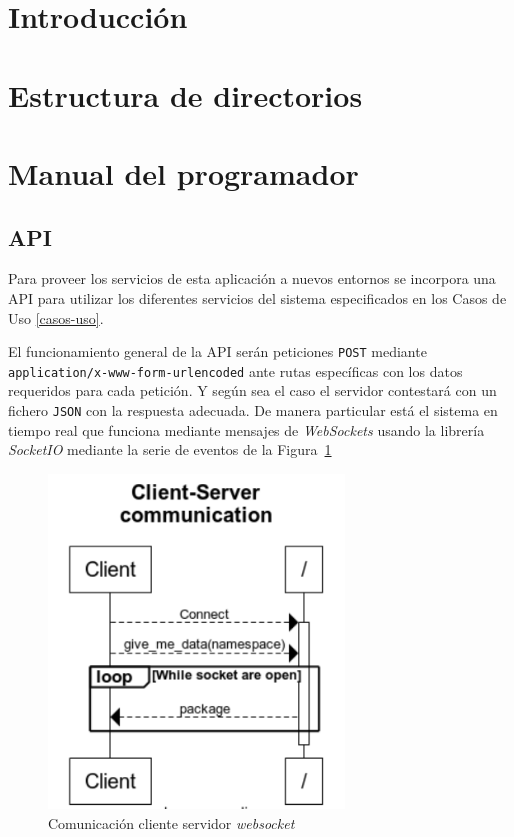 
\section{Introducción}

\section{Estructura de directorios}

\section{Manual del programador}

\subsection{API}
Para proveer los servicios de esta aplicación a nuevos entornos se incorpora una API para utilizar los diferentes servicios del sistema especificados en los Casos de Uso \ref{casos-uso}.

El funcionamiento general de la API serán peticiones \texttt{POST} mediante \texttt{application/x-www-form-urlencoded} ante rutas específicas con los datos requeridos para cada petición. Y según sea el caso el servidor contestará con un fichero \texttt{JSON} con la respuesta adecuada. De manera particular está el sistema en tiempo real que funciona mediante mensajes de \textit{WebSockets}\cite{wiki:websocket} usando la librería \textit{SocketIO}\cite{tool:socketio} mediante la serie de eventos de la Figura~\ref{fig:ws-secuence}

\begin{figure}
	\centering
	\includegraphics[width=0.7\textwidth]{img/ws-secuence.png}
	\caption{Comunicación cliente servidor \textit{websocket}}
	\label{fig:ws-secuence}
\end{figure}

